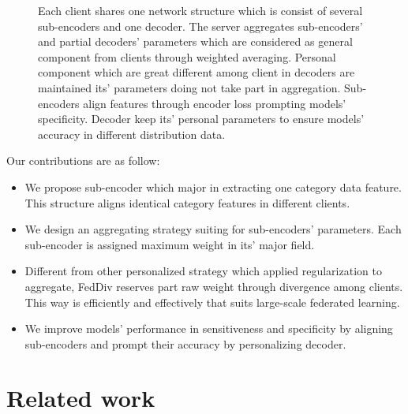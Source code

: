 \documentclass[journal]{IEEEtran}
\begin{document}
\begin{figure}
	\caption{Each client shares one network structure which is consist of several sub-encoders and one decoder. The server aggregates sub-encoders' and partial decoders' parameters which are considered as general component from clients through weighted averaging. Personal component which are great different among client in decoders are maintained its' parameters doing not take part in aggregation. Sub-encoders align features through encoder loss prompting models' specificity. Decoder keep its' personal parameters to ensure models' accuracy in different distribution data.}
	\label{fig_model}
\end{figure}

Our contributions are as follow:
\begin{itemize}
	\item We propose sub-encoder which major in extracting one category data feature. This structure aligns identical category features in different clients.
	\item We design an aggregating strategy suiting for sub-encoders' parameters. Each sub-encoder is assigned maximum weight in its' major field.
	\item Different from other personalized strategy which applied regularization to aggregate, FedDiv reserves part raw weight through divergence among clients. This way is efficiently and effectively that suits large-scale federated learning.
	\item We improve models' performance in sensitiveness and specificity by aligning sub-encoders and prompt their accuracy by personalizing decoder. 
\end{itemize}

\section{Related work}
\end{document}
